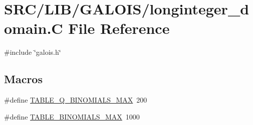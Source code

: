 \hypertarget{longinteger__domain_8_c}{}\section{S\+R\+C/\+L\+I\+B/\+G\+A\+L\+O\+I\+S/longinteger\+\_\+domain.C File Reference}
\label{longinteger__domain_8_c}
{\ttfamily \#include \char`\"{}galois.\+h\char`\"{}}\newline
\subsection*{Macros}
\begin{DoxyCompactItemize}
\item 
\#define \mbox{\hyperlink{longinteger__domain_8_c_a5162461fd41bdf453d9e9f2539c87d8e}{T\+A\+B\+L\+E\+\_\+\+Q\+\_\+\+B\+I\+N\+O\+M\+I\+A\+L\+S\+\_\+\+M\+AX}}~200
\item 
\#define \mbox{\hyperlink{longinteger__domain_8_c_aee728adc7a2080866e3b7d0f00fdcae5}{T\+A\+B\+L\+E\+\_\+\+B\+I\+N\+O\+M\+I\+A\+L\+S\+\_\+\+M\+AX}}~1000
\end{DoxyCompactItemize}
